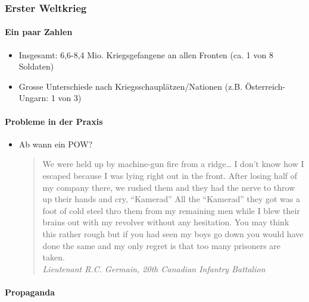 {}\documentclass[a4paper]{article}
\providecommand{\tightlist}{\setlength{\itemsep}{1mm}\setlength{\parskip}{1mm}}
\begin{document}
\subsubsection{Erster Weltkrieg}\label{erster-weltkrieg}

\paragraph{Ein paar Zahlen}\label{ein-paar-zahlen}

\begin{itemize}
	\tightlist
	\item
	      Insgesamt: 6,6-8,4 Mio. Kriegsgefangene an allen Fronten (ca. 1 von 8
	      Soldaten)
	\item
	      Grosse Unterschiede nach Kriegsschauplätzen/Nationen (z.B.
	      Österreich-Ungarn: 1 von 3)
\end{itemize}

\paragraph{Probleme in der Praxis}\label{probleme-in-der-praxis}

\begin{itemize}
	\item
	      Ab wann ein POW?

	      \begin{quote}
		      We were held up by machine-gun fire from a ridge\ldots{} I don't know
		      how I escaped because I was lying right out in the front. After losing
		      half of my company there, we rushed them and they had the nerve to
		      throw up their hands and cry, ``Kamerad'' All the ``Kamerad'' they got
		      was a foot of cold steel thro them from my remaining men while I blew
		      their brains out with my revolver without any hesitation. You may
		      think this rather rough but if you had seen my boys go down you would
		      have done the same and my only regret is that too many prisoners are
		      taken.\\
		      \emph{Lieutenant R.C. Germain, 20th Canadian Infantry Battalion}
	      \end{quote}
\end{itemize}

\paragraph{Propaganda}\label{propaganda}
\end{document}

